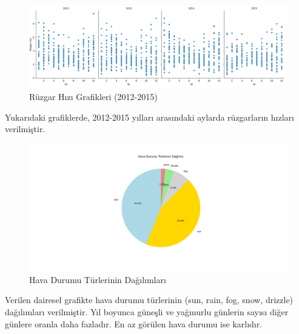\documentclass[twocolumn]{article}
\begin{document}
	\begin{figure}[h]
		\centering
		\includegraphics[width=\linewidth]{"Figures/Figure6.png"}
		\caption{Rüzgar Hızı Grafikleri (2012-2015)}
		\label{fig:ornek}
	\end{figure}
	
	Yukarıdaki grafiklerde, 2012-2015 yılları arasındaki aylarda rüzgarların hızları verilmiştir.
	
	\begin{figure}[h]
		\centering
		\includegraphics[width=\linewidth]{"Figures/Figure7.png"}
		\caption{Hava Durumu Türlerinin Dağılımları}
		\label{fig:ornek}
		
	\end{figure}
	Verilen dairesel grafikte hava durumu türlerinin (sun, rain, fog, snow, drizzle) dağılımları verilmiştir.
	Yıl boyunca güneşli ve yağmurlu günlerin sayısı diğer günlere oranla daha fazladır. En az görülen hava durumu ise karlıdır. 
	
\end{document}
